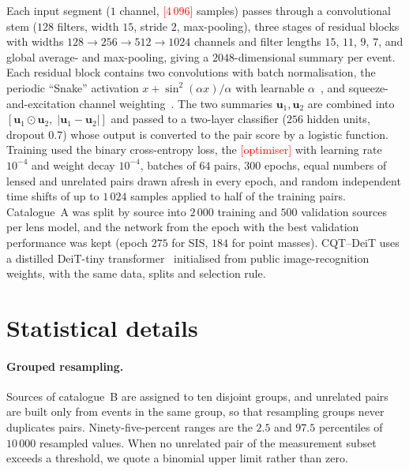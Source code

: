 \documentclass[aps,prd,twocolumn,superscriptaddress,nofootinbib,floatfix]{revtex4-2}
\newcommand{\TBD}[1]{\textcolor{red}{[#1]}}
\begin{document}
Each input segment ($1$ channel, \TBD{4\,096} samples) passes through a convolutional stem ($128$ filters, width $15$, stride $2$, max-pooling), three stages of residual blocks with widths $128\to256\to512\to1024$ channels and filter lengths $15$, $11$, $9$, $7$, and global average- and max-pooling, giving a $2048$-dimensional summary per event.
Each residual block contains two convolutions with batch normalisation, the periodic ``Snake'' activation $x+\sin^2(\alpha x)/\alpha$ with learnable $\alpha$~\cite{Snake}, and squeeze-and-excitation channel weighting~\cite{SENet}.
The two summaries $\mathbf u_1,\mathbf u_2$ are combined into $[\mathbf u_1\odot\mathbf u_2,\;|\mathbf u_1-\mathbf u_2|]$ and passed to a two-layer classifier ($256$ hidden units, dropout $0.7$) whose output is converted to the pair score by a logistic function.
Training used the binary cross-entropy loss, the \TBD{optimiser} with learning rate $10^{-4}$ and weight decay $10^{-4}$, batches of $64$ pairs, $300$ epochs, equal numbers of lensed and unrelated pairs drawn afresh in every epoch, and random independent time shifts of up to $1\,024$ samples applied to half of the training pairs.
Catalogue~A was split by source into $2\,000$ training and $500$ validation sources per lens model, and the network from the epoch with the best validation performance was kept (epoch $275$ for SIS, $184$ for point masses).
CQT--DeiT uses a distilled DeiT-tiny transformer~\cite{DeiT} initialised from public image-recognition weights, with the same data, splits and selection rule.

\section{Statistical details}
\label{app:stats}

\paragraph*{Grouped resampling.}
Sources of catalogue~B are assigned to ten disjoint groups, and unrelated pairs are built only from events in the same group, so that resampling groups never duplicates pairs.
Ninety-five-percent ranges are the $2.5$ and $97.5$ percentiles of $10\,000$ resampled values.
When no unrelated pair of the measurement subset exceeds a threshold, we quote a binomial upper limit rather than zero.
\end{document}
